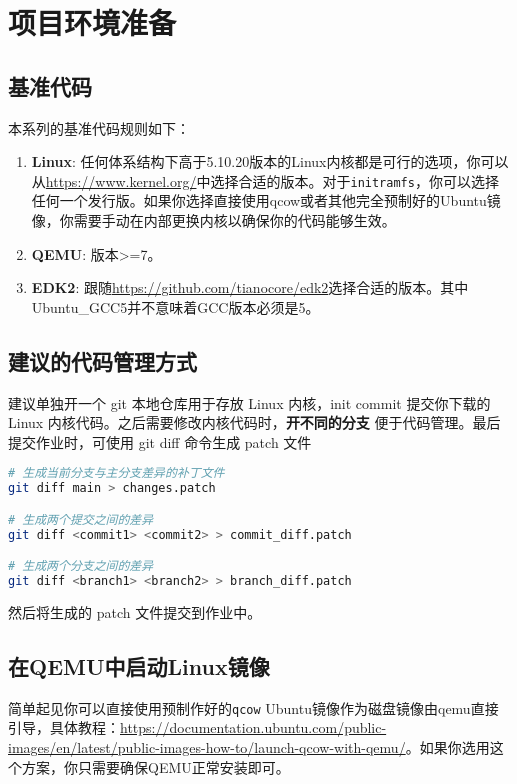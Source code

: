 \chapter{项目环境准备}

\section{基准代码}
本系列的基准代码规则如下：
\begin{enumerate}
    \item \textbf{Linux}: 任何体系结构下高于5.10.20版本的Linux内核都是可行的选项，你可以从\url{https://www.kernel.org/}中选择合适的版本。对于\texttt{initramfs}，你可以选择任何一个发行版。如果你选择直接使用qcow或者其他完全预制好的Ubuntu镜像，你需要手动在内部更换内核以确保你的代码能够生效。
    \item \textbf{QEMU}: 版本>=7。
    \item \textbf{EDK2}: 跟随\url{https://github.com/tianocore/edk2}选择合适的版本。其中Ubuntu\_GCC5并不意味着GCC版本必须是5。
\end{enumerate}

\section{建议的代码管理方式}

建议单独开一个 git 本地仓库用于存放 Linux 内核，init commit 提交你下载的 Linux 内核代码。之后需要修改内核代码时，\textbf{开不同的分支} 便于代码管理。最后提交作业时，可使用 git diff 命令生成 patch 文件
\begin{lstlisting}[language=bash]
# 生成当前分支与主分支差异的补丁文件
git diff main > changes.patch

# 生成两个提交之间的差异
git diff <commit1> <commit2> > commit_diff.patch

# 生成两个分支之间的差异
git diff <branch1> <branch2> > branch_diff.patch
\end{lstlisting}

然后将生成的 patch 文件提交到作业中。

\section{在QEMU中启动Linux镜像}
\begin{remark}
    \label{qcow-ubuntu-image}
简单起见你可以直接使用预制作好的\texttt{qcow} Ubuntu镜像作为磁盘镜像由qemu直接引导，具体教程：\url{https://documentation.ubuntu.com/public-images/en/latest/public-images-how-to/launch-qcow-with-qemu/}。如果你选用这个方案，你只需要确保QEMU正常安装即可。
\end{remark}

